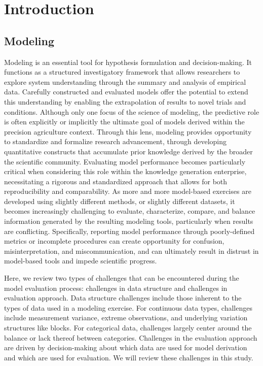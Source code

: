 \section{Introduction}

\subsection{Modeling}

Modeling is an essential tool for hypothesis formulation and decision-making. It functions as a structured investigatory framework that allows researchers to explore system understanding through the summary and analysis of empirical data. Carefully constructed and evaluated models offer the potential to extend this understanding by enabling the extrapolation of results to novel trials and conditions. Although only one focus of the science of modeling, the predictive role is often explicitly or implicitly the ultimate goal of models derived within the precision agriculture context. Through this lens, modeling provides opportunity to standardize and formalize research advancement, through developing quantitative constructs that accumulate prior knowledge derived by the broader the scientific community. Evaluating model performance becomes particularly critical when considering this role within the knowledge generation enterprise, necessitating a rigorous and standardized approach that allows for both reproducibility and comparability. As more and more model-based exercises are developed using slightly different methods, or slightly different datasets, it becomes increasingly challenging to evaluate, characterize, compare, and balance information generated by the resulting modeling tools, particularly when results are conflicting. Specifically, reporting model performance through poorly-defined metrics or incomplete procedures can create opportunity for confusion, misinterpretation, and miscommunication, and can ultimately result in distrust in model-based tools and impede scientific progress.

Here, we review two types of challenges that can be encountered during the model evaluation process: challenges in data structure and challenges in evaluation approach. Data structure challenges include those inherent to the types of data used in a modeling exercise. For continuous data types, challenges include measurement variance, extreme observations, and underlying variation structures like blocks. For categorical data, challenges largely center around the balance or lack thereof between categories.  Challenges in the evaluation approach are driven by decision-making about which data are used for model derivation and which are used for evaluation. We will review these challenges in this study.

